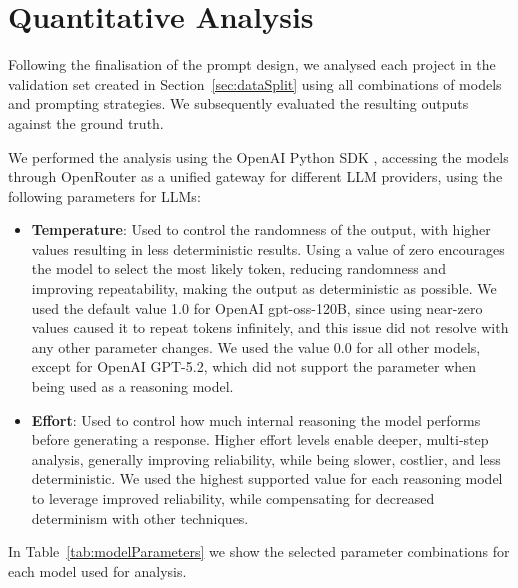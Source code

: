 \section{Quantitative Analysis}\label{sec:experimentsQuantitative}

Following the finalisation of the prompt design, we analysed each project in the validation set created in Section~\ref{sec:dataSplit} using all combinations of models and prompting strategies. We subsequently evaluated the resulting outputs against the ground truth.

We performed the analysis using the OpenAI Python SDK , accessing the models through OpenRouter  as a unified gateway for different LLM providers, using the following parameters for LLMs:

\begin{itemize}
    \item \textbf{Temperature}: Used to control the randomness of the output, with higher values resulting in less deterministic results. Using a value of zero encourages the model to select the most likely token, reducing randomness and improving repeatability, making the output as deterministic as possible. We used the default value \num{1.0} for OpenAI gpt-oss-120B, since using near-zero values caused it to repeat tokens infinitely, and this issue did not resolve with any other parameter changes. We used the value \num{0.0} for all other models, except for OpenAI GPT-5.2, which did not support the parameter when being used as a reasoning model.
    \item \textbf{Effort}: Used to control how much internal reasoning the model performs before generating a response. Higher effort levels enable deeper, multi‑step analysis, generally improving reliability, while being slower, costlier, and less deterministic. We used the highest supported value for each reasoning model to leverage improved reliability, while compensating for decreased determinism with other techniques.
\end{itemize}

In Table~\ref{tab:modelParameters} we show the selected parameter combinations for each model used for analysis.

